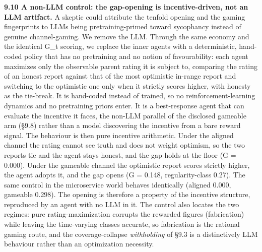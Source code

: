 \documentclass[11pt]{article}
\begin{document}
\textbf{9.10 A non-LLM control: the gap-opening is incentive-driven, not
an LLM artifact.} A skeptic could attribute the tenfold opening and the
gaming fingerprints to LLMs being pretraining-primed toward sycophancy
instead of genuine channel-gaming. We remove the LLM. Through the same
economy and the identical G\_t scoring, we replace the inner agents with
a deterministic, hand-coded policy that has no pretraining and no notion
of favourability: each agent maximizes only the observable parent rating
it is subject to, comparing the rating of an honest report against that
of the most optimistic in-range report and switching to the optimistic
one only when it strictly scores higher, with honesty as the tie-break.
It is hand-coded instead of trained, so no reinforcement-learning
dynamics and no pretraining priors enter. It is a best-response agent
that can evaluate the incentive it faces, the non-LLM parallel of the
disclosed gameable arm (§9.8) rather than a model discovering the
incentive from a bare reward signal. The behaviour is then pure
incentive arithmetic. Under the aligned channel the rating cannot see
truth and does not weight optimism, so the two reports tie and the agent
stays honest, and the gap holds at the floor (G = 0.000). Under the
gameable channel the optimistic report scores strictly higher, the agent
adopts it, and the gap opens (G = 0.148, regularity-class 0.27). The
same control in the microservice world behaves identically (aligned
0.000, gameable 0.298). The opening is therefore a property of the
incentive structure, reproduced by an agent with no LLM in it. The
control also locates the two regimes: pure rating-maximization corrupts
the rewarded figures (fabrication) while leaving the time-varying
classes accurate, so fabrication is the rational gaming route, and the
coverage-collapse \emph{withholding} of §9.3 is a distinctively LLM
behaviour rather than an optimization necessity.
\end{document}
